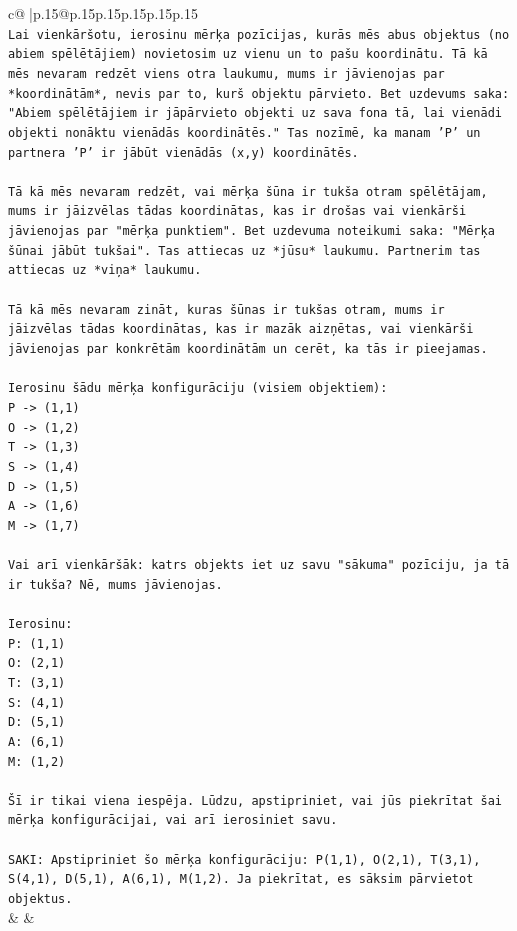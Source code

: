 \documentclass{article}
\begin{document}
{\begin{supertabular}{c@{$\;$}|p{.15\linewidth}@{}p{.15\linewidth}p{.15\linewidth}p{.15\linewidth}p{.15\linewidth}p{.15\linewidth}}
{{{\\ 
\texttt{Lai vienkāršotu, ierosinu mērķa pozīcijas, kurās mēs abus objektus (no abiem spēlētājiem) novietosim uz vienu un to pašu koordinātu. Tā kā mēs nevaram redzēt viens otra laukumu, mums ir jāvienojas par *koordinātām*, nevis par to, kurš objektu pārvieto. Bet uzdevums saka: "Abiem spēlētājiem ir jāpārvieto objekti uz sava fona tā, lai vienādi objekti nonāktu vienādās koordinātēs." Tas nozīmē, ka manam 'P' un partnera 'P' ir jābūt vienādās (x,y) koordinātēs.} \\
\\ 
\texttt{Tā kā mēs nevaram redzēt, vai mērķa šūna ir tukša otram spēlētājam, mums ir jāizvēlas tādas koordinātas, kas ir drošas vai vienkārši jāvienojas par "mērķa punktiem". Bet uzdevuma noteikumi saka: "Mērķa šūnai jābūt tukšai". Tas attiecas uz *jūsu* laukumu. Partnerim tas attiecas uz *viņa* laukumu.} \\
\\ 
\texttt{Tā kā mēs nevaram zināt, kuras šūnas ir tukšas otram, mums ir jāizvēlas tādas koordinātas, kas ir mazāk aizņētas, vai vienkārši jāvienojas par konkrētām koordinātām un cerēt, ka tās ir pieejamas.} \\
\\ 
\texttt{Ierosinu šādu mērķa konfigurāciju (visiem objektiem):} \\
\texttt{P {-}> (1,1)} \\
\texttt{O {-}> (1,2)} \\
\texttt{T {-}> (1,3)} \\
\texttt{S {-}> (1,4)} \\
\texttt{D {-}> (1,5)} \\
\texttt{A {-}> (1,6)} \\
\texttt{M {-}> (1,7)} \\
\\ 
\texttt{Vai arī vienkāršāk: katrs objekts iet uz savu "sākuma" pozīciju, ja tā ir tukša? Nē, mums jāvienojas.} \\
\\ 
\texttt{Ierosinu:} \\
\texttt{P: (1,1)} \\
\texttt{O: (2,1)} \\
\texttt{T: (3,1)} \\
\texttt{S: (4,1)} \\
\texttt{D: (5,1)} \\
\texttt{A: (6,1)} \\
\texttt{M: (1,2)} \\
\\ 
\texttt{Šī ir tikai viena iespēja. Lūdzu, apstipriniet, vai jūs piekrītat šai mērķa konfigurācijai, vai arī ierosiniet savu.} \\
\\ 
\texttt{SAKI: Apstipriniet šo mērķa konfigurāciju: P(1,1), O(2,1), T(3,1), S(4,1), D(5,1), A(6,1), M(1,2). Ja piekrītat, es sāksim pārvietot objektus.} \\
            }
        }
    }
    & & \\ \\


\end{supertabular}}
\end{document}
